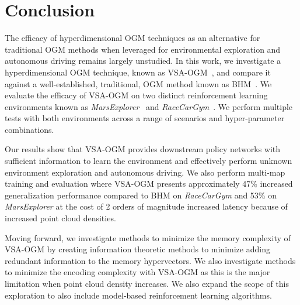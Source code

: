 \section{Conclusion}
\label{sec:conclusion}

\noindent
The efficacy of hyperdimensional OGM techniques as an alternative for traditional OGM methods when leveraged for environmental exploration and autonomous driving remains largely unstudied. In this work, we investigate a hyperdimensional OGM technique, known as VSA-OGM~\cite{snyder2024brain}, and compare it against a well-established, traditional, OGM method known as BHM~\cite{senanayake2017bayesian}.
We evaluate the efficacy of VSA-OGM on two distinct reinforcement learning environments known as \textit{MarsExplorer}~\cite{Koutras2021MarsExplorer} and \textit{RaceCarGym}~\cite{Brunnbauer_racecar_gym}. We perform multiple tests with both environments across a range of scenarios and hyper-parameter combinations.

Our results show that VSA-OGM provides downstream policy networks with sufficient information to learn the environment and effectively perform unknown environment exploration and autonomous driving. We also perform multi-map training and evaluation where VSA-OGM presents approximately 47\% increased generalization performance compared to BHM on \textit{RaceCarGym} and 53\% on \textit{MarsExplorer} at the cost of 2 orders of magnitude increased latency because of increased point cloud densities.


Moving forward, we investigate methods to minimize the memory complexity of VSA-OGM by creating information theoretic methods to minimize adding redundant information to the memory hypervectors. We also investigate methods to minimize the encoding complexity with VSA-OGM as this is the major limitation when point cloud density increases.
We also expand the scope of this exploration to also include model-based reinforcement learning algorithms.